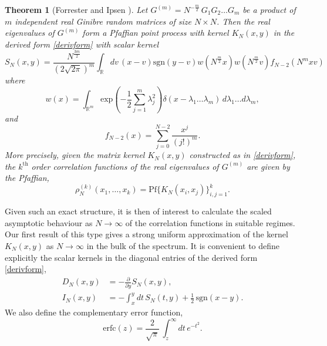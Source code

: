 \documentclass[11pt,reqno]{amsproc}
\newtheorem{theorem}{Theorem}
\numberwithin{equation}{section}
\numberwithin{theorem}{section}
\begin{document}
\begin{theorem}[Forrester and Ipsen \cite{FI16}]
\label{th:ik}
Let $G^{(m)} = N^{-\frac{m}{2}}\,G_{1}G_{2}\ldots G_{m}$ be a product of $m$ independent real Ginibre random matrices of size $N \times N$. Then the real eigenvalues of $G^{(m)}$ form a Pfaffian point process with kernel $K_{N}(x,y)$ in the derived form \eqref{derivform} with scalar kernel
\begin{equation}
S_{N}(x,y) = \frac{N^{\frac{3m}{2}}}{(2\sqrt{2\pi})^{m}}\int_{\mathbb{R}}dv\,(x-v)\mathrm{sgn}(y-v)w(N^{\frac{m}{2}}x)w(N^{\frac{m}{2}}v)f_{N-2}(N^{m}xv) \label{prekernel}
\end{equation}
where 
\begin{equation}
w(x) = \int_{\mathbb{R}^{m}}\mathrm{exp}\left(-\frac{1}{2}\sum_{j=1}^{m}\lambda_{j}^{2}\right)\delta(x-\lambda_{1}\ldots \lambda_{m})\,d\lambda_{1}\ldots d\lambda_{m}, \label{ginweightdef1}
\end{equation}
and
\begin{equation}
f_{N-2}(x) = \sum_{j=0}^{N-2}\frac{x^{j}}{(j!)^{m}} .\label{ginfdef1}
\end{equation}
More precisely, given the matrix kernel $K_{N}(x,y)$ constructed as in \eqref{derivform}, the $k^{\mathrm{th}}$ order correlation functions of the real eigenvalues of $G^{(m)}$ are given by the Pfaffian,
\begin{equation}
\rho^{(k)}_{N}(x_1,\ldots,x_k) = \mathrm{Pf}\bigg\{K_{N}(x_i,x_j)\bigg\}_{i,j=1}^{k}.
\end{equation}
\end{theorem}
Given such an exact structure, it is then of interest to calculate the scaled asymptotic behaviour as $N \to \infty$ of the correlation functions in suitable regimes. Our first result of this type gives a strong uniform approximation of the kernel $K_{N}(x,y)$ as $N \to \infty$ in the bulk of the spectrum. It is convenient to define explicitly the scalar kernels in the diagonal entries of the derived form \eqref{derivform},
\begin{align}
D_{N}(x,y) &= -\frac{\partial}{\partial y}S_{N}(x,y) \label{dkernintro},\\
I_{N}(x,y) &= -\int_{x}^{y}dt\,S_{N}(t,y)+\frac{1}{2} \,\mathrm{sgn}(x-y).\label{ikernintro}
\end{align}
We also define the complementary error function,
\begin{equation}
\mathrm{erfc}(z) = \frac{2}{\sqrt{\pi}}\,\int_{z}^{\infty}dt\,e^{-t^{2}}.
\end{equation}
\end{document}
